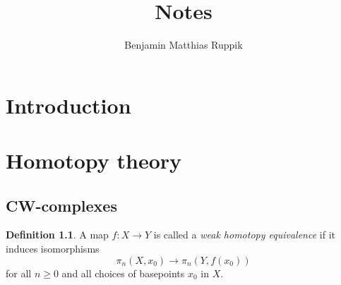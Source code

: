 \documentclass{tufte-book} %
\title{Notes} %
\author{Benjamin Matthias Ruppik} %
\theoremstyle{definition}
\newtheorem{definition}{Definition}
\theoremstyle{remark}
\begin{document}
\frontmatter




\tableofcontents %






\chapter*{Introduction} %



\mainmatter

\chapter{Homotopy theory}

\section{CW-complexes}

\begin{definition}
	A map $f \colon X \rightarrow Y$ is called a
	\textit{weak homotopy equivalence} 
	if it induces isomorphisms
	\[
	\pi_n(X, x_0) \rightarrow \pi_n(Y, f(x_0))
	\]
	for all $n \ge 0$ and all choices of basepoints $x_0$ in $X$.
\end{definition}
\end{document}
